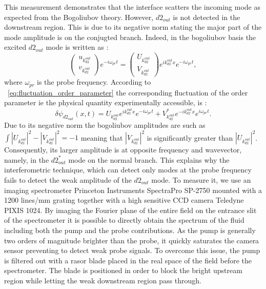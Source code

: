 This measurement demonstrates that the interface scatters the incoming mode as expected from the Bogoliubov theory. However, $d2_{out}$ is not detected in the downstream region. This is due to its negative norm stating the major part of the mode amplitude is on the conjugted branch.
Indeed, in the bogoliubov basis the excited $d2_{out}$ mode is written as :
\begin{equation}
    \begin{pmatrix}
        u_{k_{d2}^{out}} \\
        v_{k_{d2}^{out}}
    \end{pmatrix}e^{-i\omega_{pr}t}=
    \begin{pmatrix}
    U_{k_{d2}^{out}} \\
    V_{k_{d2}^{out}}
    \end{pmatrix}e^{ik_{d2}^{out}x}e^{-i\omega_{pr}t}, 
\end{equation}
where $\omega_{pr}$ is the probe frequency. According to ~\ref{eq:fluctuation_order_parameter} the corresponding fluctuation of the order parameter ie the physical quantity experimentally accessible, is :
\begin{equation}
    \delta\psi_{{d2_{out}}}(x,t)= U_{k_{d2}^{out}}e^{ik_{d2}^{out}x}e^{-i\omega_{pr}t}+V_{k_{d2}^{out}}^*e^{-ik_{d2}^{out}x}e^{i\omega_{pr}t}.
    \label{eq:order_param_d2_out}
\end{equation}
Due to its negative norm the bogoliubov amplitudes are such as $\int |U_{k_{d2}^{out}}|^2-|V_{k_{d2}^{out}}|^2=-1$ meaning that  $|V_{k_{d2}^{out}}|^2$ is significantly greater than $|U_{k_{d2}^{out}}|^2$. 
Consequently, its larger amplitude is at opposite frequency and wavevector, namely, in the $d2_{out}^*$ mode on the normal branch. This explains why the interferometric technique, which 
can detect only modes at the probe frequency fails to detect the weak amplitude of the $d2_{out}$ mode. To measure it, we use an imaging spectrometer Princeton Instruments SpectraPro SP-2750 mounted with a 1200 lines/mm grating together with a high sensitive CCD camera Teledyne PIXIS 1024. By 
imaging the Fourier plane of the entire field on the entrance slit of the spectrometer it is possible to directly obtain the spectrum of the fluid including both the pump and the probe contributions.
As the pump is generally two orders of magnitude brighter than the probe, it quickly saturates the camera sensor preventing to detect weak probe signals. To overcome this issue,
the pump is filtered out with a rasor blade placed in the real space of the field before the spectrometer. The blade is positioned in order to block the bright upstream region while letting the weak downstream region pass through.
